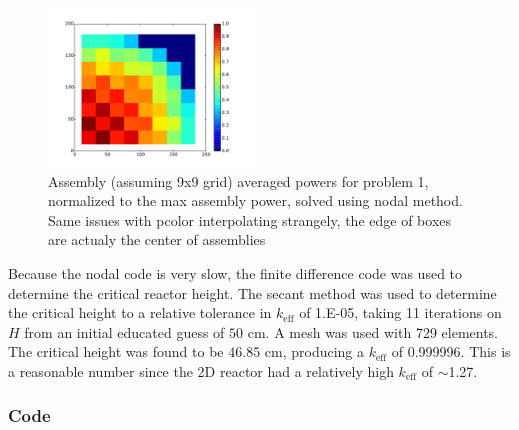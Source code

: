 \documentclass[12pt]{article}
\newcommand{\keff}{\ensuremath{k_{\mathrm{eff}}}}
\newenvironment{solnum}[2][Solution]{\begin{trivlist}
\item[\hskip \labelsep {\bfseries #1}\hskip \labelsep {\bfseries #2:}]\hspace{0.3in}\newline\newline}{\end{trivlist}}
\begin{document}
\begin{solnum}{1-2}
\begin{figure}
    \centering
    \caption{Assembly (assuming 9x9 grid) averaged powers for problem 1, normalized
    to the max assembly power, solved using nodal method. Same issues with pcolor interpolating strangely, the edge of boxes are actualy the center of assemblies}
    \includegraphics[width=0.5\textwidth]{powers_nodal.pdf}
\end{figure}



\end{solnum}

\clearpage

\begin{solnum}{1-3}

Because the nodal code is very slow, the finite difference code was used to determine
the critical reactor height. The secant method was used to determine the critical
height to a relative tolerance in $\keff$ of 1.E-05, taking 11 iterations on $H$
from an initial educated guess of $50$ cm.  A mesh was used with 729 elements. The
critical height was found to be  $46.85$ cm, producing a $\keff$ of 0.999996. This
is a reasonable number since the 2D reactor had a relatively high $\keff$ of
$\sim$1.27.
\end{solnum}

\clearpage

\clearpage
\subsubsection*{Code}

\end{document}
